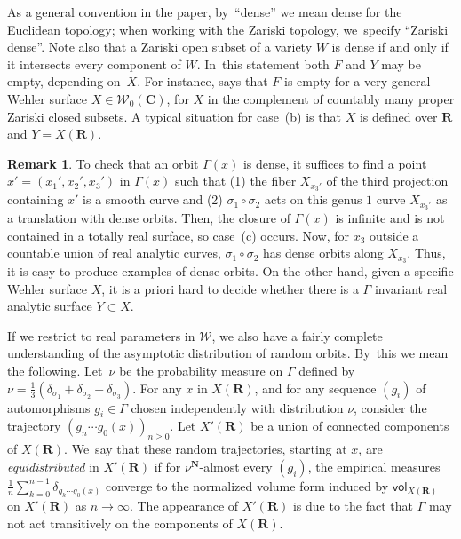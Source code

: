 \documentclass[JEP,XML,SOM,Unicode,published]{cedram}
\newcommand{\unsur}[1]{\frac{1}{#1}}
\def\C{\mathbf{C}}
\def\R{\mathbf{R}}
\def\N{\mathbf{N}}
\newcommand{\cW}{\mathcal{W}}
\newcommand{\vol}{{\mathsf{vol}}}
\theoremstyle{plain}
\theoremstyle{definition}
\newtheorem{rem}[thm]{Remark}
\begin{document}
As a general convention in the paper, by~``dense'' we mean dense for the Euclidean topology; when working with the Zariski topology, we~specify ``Zariski dense''. Note also that a Zariski open subset of a variety
$W$ is dense if and only if it intersects every component of $W$. In~this statement both $F$ and $Y$ may be empty, depending on~$X$.
For instance, \cite[Th.\,A]{finite_orbits} says that $F$ is empty for a very general Wehler surface $X\in \cW_0(\C)$,
\ie for $X$ in the complement of countably many proper Zariski closed subsets. A typical situation for
case~(b) is that $X$ is defined over $\R$ and $Y=X(\R)$.

\begin{rem}
To check that an orbit $\Gamma(x)$ is dense, it suffices to find a point $x'=(x_1',x_2',x_3')$ in $\Gamma(x)$ such that (1) the fiber $X_{x_3'}$ of the third projection containing $x'$ is a smooth curve and (2) $\sigma_1\circ\sigma_2$ acts on this genus $1$ curve $X_{x_3'}$ as a translation with dense orbits. Then, the closure of $\Gamma(x)$ is infinite and is not contained in a totally real surface, so case~(c) occurs.
Now, for $x_3$ outside a countable union of real analytic curves, $\sigma_1\circ\sigma_2$ has dense orbits along $X_{x_3}$. Thus, it is easy to produce examples of dense orbits.
On the other hand, given a specific Wehler surface $X$, it is a priori hard to decide whether there is a $\Gamma$ invariant real analytic surface $Y\subset X$.
\end{rem}

If we restrict to real parameters in $ \cW$, we
also have a fairly complete understanding
of the asymptotic distribution of random orbits. By~this we mean the following.
Let~$\nu$ be the probability measure on $\Gamma$ defined by
$\nu = \frac{1}{3}(\delta_{\sigma_1}+ \delta_{\sigma_2}+\delta_{\sigma_3})$. For any $x$ in $X(\R)$, and for any sequence $(g_i)$ of
automorphisms $g_i\in \Gamma$ chosen independently with distribution $\nu$, consider the trajectory $(g_n\cdots g_0(x))_{n\geq 0}$.
Let $X'(\R)$ be a union of connected components of $X(\R)$. We~say that these random trajectories, starting at $x$, are \emph{equidistributed} in $X'(\R)$ if for $\nu^\N$-almost every $(g_i)$, the empirical measures
$\unsur{n} \sum_{k=0}^{n-1} \delta_{g_k\cdots g_0(x)}$ converge
to the normalized volume form induced by $\vol_{X(\R)}$ on $X'(\R)$ as $n\to\infty$. The appearance of $X'(\R)$ is due to the fact that $\Gamma$ may not act transitively on the
components of $X(\R)$.
\end{document}
